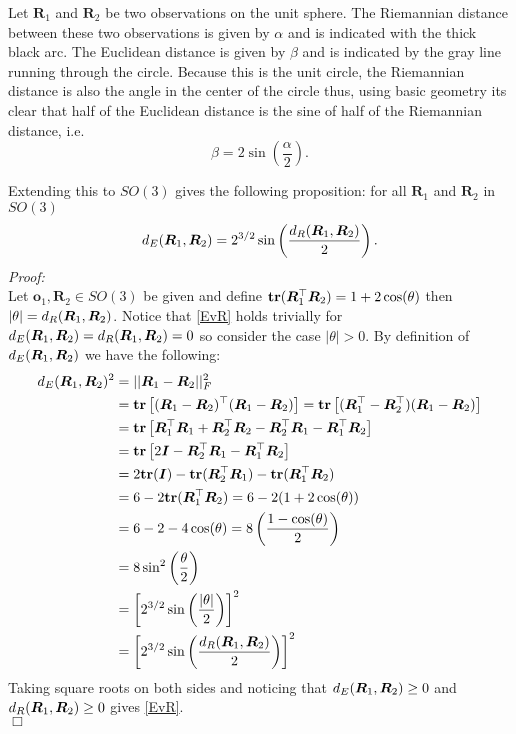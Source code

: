 Let $\bm R_1$ and $\bm R_2$ be two observations on the unit sphere.  The Riemannian distance between these two observations is given by $\alpha$ and is indicated with the thick black arc.  The Euclidean distance is given by $\beta$ and is indicated by the gray line running through the circle.  Because this is the unit circle, the Riemannian distance is also the angle in the center of the circle thus, using basic geometry its clear that half of the Euclidean distance is the sine of half of the Riemannian distance, i.e.
\[
\beta=2\sin\left(\frac{\alpha}{2}\right).
\]

Extending this to $SO(3)$ gives the following proposition: for all $\bm{R}_1$ and $\bm{R}_2$ in $SO(3)$
\begin{equation}\label{EvR}
{d_E} (\bm{R}_1,\bm{R}_2)=2^{3/2}\sin\left(\frac{{d_R}(\bm{R}_1,\bm{R}_2)}{2}\right).
\end{equation}
\emph{Proof:}\\
Let $\bm{o}_1,\bm{R}_2\in SO(3)$ be given and define ${\mathbf{tr}}(\bm R_1^\top\bm R_2)=1+2\cos(\theta)$ then $|\theta|={d_R}(\bm R_1,\bm R_2)$.  Notice that \eqref{EvR} holds trivially for ${d_E} (\bm R_1,\bm R_2)={d_R}(\bm R_1,\bm R_2)=0$ so consider the case $|\theta|>0$.  By definition of ${d_E} (\bm R_1,\bm R_2)$ we have the following:
\begin{align*}
{d_E} (\bm R_1,\bm R_2)^2
&=||\bm R_1-\bm R_2||_F^2\\
&={\mathbf{tr}}\left[(\bm R_1-\bm R_2)^\top(\bm R_1-\bm R_2)\right]={\mathbf{tr}}\left[(\bm R_1^\top-\bm R_2^\top)(\bm R_1-\bm R_2)\right]\\
&={\mathbf{tr}}\left[\bm R_1^\top\bm R_1+\bm R_2^\top\bm R_2-\bm R_2^\top\bm R_1-\bm R_1^\top\bm R_2\right]\\
&={\mathbf{tr}}\left[2\bm{I}-\bm R_2^\top\bm R_1-\bm R_1^\top\bm R_2\right]\\
&=2{\mathbf{tr}}(\bm{I})-{\mathbf{tr}}(\bm R_2^\top\bm R_1)-{\mathbf{tr}}(\bm R_1^\top\bm R_2)\\
&=6-2{\mathbf{tr}}(\bm R_1^\top\bm R_2)=6-2(1+2\cos(\theta))\\
&=6-2-4\cos(\theta)=8\left(\frac{1-\cos(\theta)}{2}\right)\\
&=8\sin^2\left(\frac{\theta}{2}\right)\\
&=\left[2^{3/2}\sin\left(\frac{|\theta|}{2}\right)\right]^2\\
&=\left[2^{3/2}\sin\left(\frac{{d_R}(\bm R_1,\bm R_2)}{2}\right)\right]^2
\end{align*}
Taking square roots on both sides and noticing that ${d_E} (\bm R_1,\bm R_2)\geq0$ and ${d_R} (\bm R_1,\bm R_2)\geq0$ gives \eqref{EvR}.\\
$\Box$

